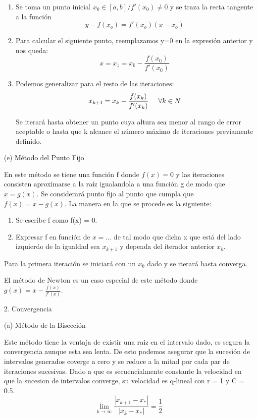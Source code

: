 \documentclass[11pt]{article}
\begin{document}
\begin{enumerate}
	\item[\textperiodcentered] Se toma un punto inicial $x_0 \in [a,b] / f'(x_0)\neq 0$ y se traza la recta tangente a la función
	$$y - f(x_o) = f'(x_o)(x-x_o)$$
	\item[\textperiodcentered] Para calcular el siguiente punto, reemplazamos y=0 en la expresión anterior y nos queda: $$x = x_1 = x_0 - \frac{f(x_0)}{f'(x_0)}$$
	\item[\textperiodcentered] Podemos generalizar para el resto de las iteraciones: $$ x_{k+1} = x_k - \frac{f(x_k)}{f'(x_k)}\hspace{0.5cm} \forall k \in N$$ 
	
	Se iterará hasta obtener un punto cuya altura sea menor al rango de error aceptable o hasta que k alcance el número máximo de iteraciones previamente definido.
\end{enumerate}
\vspace{0.5cm}


{\large (e) Método del Punto Fijo}

En este método se tiene una función f donde $f(x) = 0$ y las iteraciones consisten aproximarse a la raíz igualandola a una función g de modo que $x = g(x)$. Se considerará punto fijo al punto que cumpla que $f(x) = x - g(x)$. La manera en la que se procede es la siguiente:

\begin{enumerate}
	\item[\textperiodcentered] Se escribe f como f(x) = 0.
	\item[\textperiodcentered] Expresar f en función de $x = ...$ de tal modo que dicha x que está del lado izquierdo de la igualdad sea $x_{k+1}$ y dependa del iterador anterior $x_k$.
\end{enumerate}
Para la primera iteración se iniciará con un $x_0$ dado y se iterará hasta converga.

El método de Newton es un caso especial de este método donde $g(x) = x - \frac{f(x)}{f’(x)}$.
\vspace{0.75cm}

\begin{center} \Large {2. Convergencia} \end{center}

{\large (a) Método de la Bisección}

Este método tiene la ventaja de existir una raiz en el intervalo dado, es segura la convergencia aunque esta sea lenta. De esto podemos asegurar que la sucesión de intervalos generados coverge a cero y se reduce a la mitad por cada par de iteraciones sucesivas. Dado a que es secuencialmente constante la velocidad en que la sucesion de intervalos converge, su velocidad es q-lineal con r = 1 y C = 0.5. 
$$\lim_{k \to \infty}{\frac{|x_{k+1}-x_*|}{|x_k-x_*|}} = \frac{1}{2}$$
\end{document}
